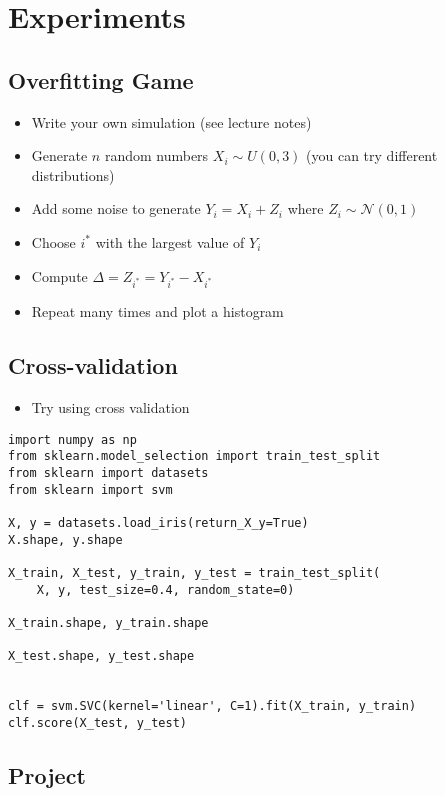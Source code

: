 \documentclass[11pt]{article}
\begin{document}
\section{Experiments}
\label{sec:org4b77ae2}

\subsection{Overfitting Game}
\label{sec:org0e2d341}
\begin{itemize}
\item Write your own simulation (see lecture notes)
\item Generate \(n\) random numbers \(X_i\sim U(0,3)\) (you can try different distributions)
\item Add some noise to generate \(Y_i = X_i + Z_i\) where \(Z_i\sim\mathcal{N}(0,1)\)
\item Choose \(i^*\) with the largest value of \(Y_i\)
\item Compute \(\Delta = Z_{i^*}= Y_{i^*}-X_{i^*}\)
\item Repeat many times and plot a histogram
\end{itemize}

\subsection{Cross-validation}
\label{sec:orgfb6bb14}
\begin{itemize}
\item Try using cross validation
\end{itemize}

\begin{verbatim}
import numpy as np
from sklearn.model_selection import train_test_split
from sklearn import datasets
from sklearn import svm

X, y = datasets.load_iris(return_X_y=True)
X.shape, y.shape

X_train, X_test, y_train, y_test = train_test_split(
    X, y, test_size=0.4, random_state=0)

X_train.shape, y_train.shape

X_test.shape, y_test.shape


clf = svm.SVC(kernel='linear', C=1).fit(X_train, y_train)
clf.score(X_test, y_test)
\end{verbatim}

\subsection{Project}
\label{sec:org88dcc73}
\end{document}
